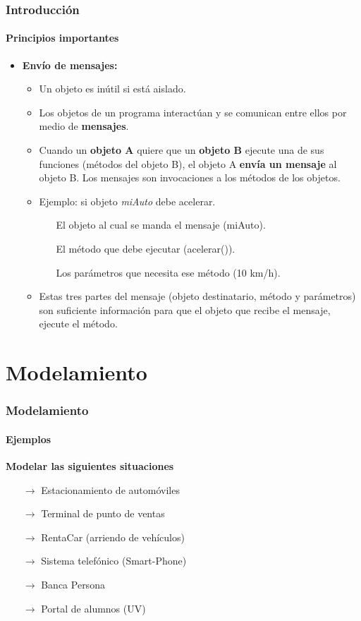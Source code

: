 \documentclass{beamer}
\begin{document}
		\begin{frame}
			\frametitle{Introducci\'on}
			\framesubtitle{Principios importantes}

			\begin{itemize}
				\item \textbf{Env\'io de mensajes:}
				\begin{itemize}
  					\item Un objeto es in\'util si est\'a aislado.
  					\item Los objetos de un programa interact\'uan y se comunican entre ellos por medio de \textbf{mensajes}.
  					\item Cuando un \textbf{objeto A} quiere que un \textbf{objeto B} ejecute una de sus funciones (m\'etodos del objeto B), el objeto A \textbf{env\'ia un mensaje} al objeto B. Los mensajes son invocaciones a los m\'etodos de los objetos. 
  					\item Ejemplo: si objeto \emph{miAuto} debe acelerar.
  					\begin{itemize}
  						\item[] El objeto al cual se manda el mensaje (miAuto).
  						\item[] El m\'etodo que debe ejecutar (acelerar()).
  						\item[] Los par\'ametros que necesita ese m\'etodo (10 km/h).
					\end{itemize}
					\item Estas tres partes del mensaje (objeto destinatario, m\'etodo y par\'ametros) son suficiente informaci\'on para que el objeto que recibe el mensaje, ejecute el m\'etodo.
				\end{itemize}
			\end{itemize}
		\end{frame}

	\section{Modelamiento}

		\begin{frame}
			\frametitle{Modelamiento}
			\framesubtitle{Ejemplos}

			\textbf{Modelar las siguientes situaciones}

			\begin{itemize}
				\item[$\rightarrow$] Estacionamiento de autom\'oviles
				\item[$\rightarrow$] Terminal de punto de ventas
				\item[$\rightarrow$] RentaCar (arriendo de veh\'iculos)
				\item[$\rightarrow$] Sistema telef\'onico (Smart-Phone)
				\item[$\rightarrow$] Banca Persona
				\item[$\rightarrow$] Portal de alumnos (UV)
			\end{itemize}
		\end{frame}
\end{document}
